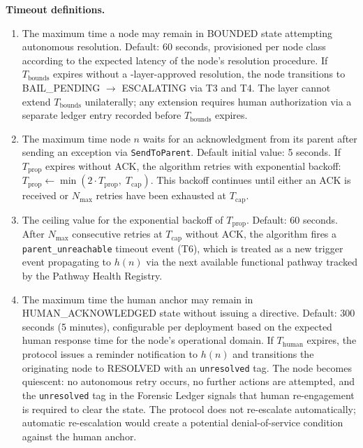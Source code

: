 \medskip\noindent\textbf{Timeout definitions.}

\begin{enumerate}\itemsep=0pt
\item[\textbf{$T_{\text{bounds}}$ — Bounds Engine resolution timeout.}] The maximum time a node may remain in BOUNDED state attempting autonomous resolution. Default: 60 seconds, provisioned per node class according to the expected latency of the node's resolution procedure. If $T_{\text{bounds}}$ expires without a \fact-layer-approved resolution, the node transitions to BAIL\_PENDING $\rightarrow$ ESCALATING via T3 and T4. The \fact{} layer cannot extend $T_{\text{bounds}}$ unilaterally; any extension requires human authorization via a separate ledger entry recorded before $T_{\text{bounds}}$ expires.

\item[\textbf{$T_{\text{prop}}$ — Per-hop propagation timeout.}] The maximum time node $n$ waits for an acknowledgment from its parent after sending an exception via \texttt{SendToParent}. Default initial value: 5 seconds. If $T_{\text{prop}}$ expires without ACK, the algorithm retries with exponential backoff: $T_{\text{prop}} \leftarrow \min(2 \cdot T_{\text{prop}},\; T_{\text{cap}})$. This backoff continues until either an ACK is received or $N_{\max}$ retries have been exhausted at $T_{\text{cap}}$.

\item[\textbf{$T_{\text{cap}}$ — Maximum propagation timeout value.}] The ceiling value for the exponential backoff of $T_{\text{prop}}$. Default: 60 seconds. After $N_{\max}$ consecutive retries at $T_{\text{cap}}$ without ACK, the algorithm fires a \texttt{parent\_unreachable} timeout event (T6), which is treated as a new trigger event propagating to $h(n)$ via the next available functional pathway tracked by the Pathway Health Registry.

\item[\textbf{$T_{\text{human}}$ — Human acknowledgment timeout.}] The maximum time the human anchor may remain in HUMAN\_ACKNOWLEDGED state without issuing a directive. Default: 300 seconds (5 minutes), configurable per deployment based on the expected human response time for the node's operational domain. If $T_{\text{human}}$ expires, the protocol issues a reminder notification to $h(n)$ and transitions the originating node to RESOLVED with an \texttt{unresolved} tag. The node becomes quiescent: no autonomous retry occurs, no further actions are attempted, and the \texttt{unresolved} tag in the Forensic Ledger signals that human re-engagement is required to clear the state. The protocol does not re-escalate automatically; automatic re-escalation would create a potential denial-of-service condition against the human anchor.
\end{enumerate}

